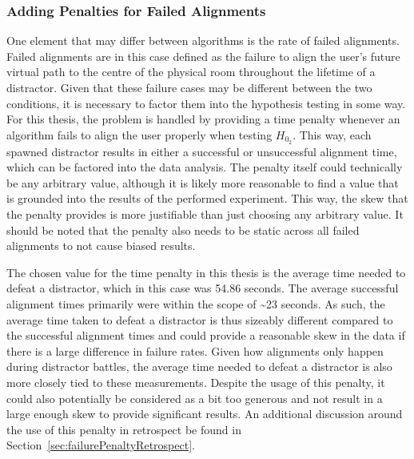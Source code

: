\subsubsection{Adding Penalties for Failed Alignments}
One element that may differ between algorithms is the rate of failed alignments. Failed alignments are in this case defined as the failure to align the user's future virtual path to the centre of the physical room throughout the lifetime of a distractor. Given that these failure cases may be different between the two conditions, it is necessary to factor them into the hypothesis testing in some way. For this thesis, the problem is handled by providing a time penalty whenever an algorithm fails to align the user properly when testing $H_{0_2}$. This way, each spawned distractor results in either a successful or unsuccessful alignment time, which can be factored into the data analysis. The penalty itself could technically be any arbitrary value, although it is likely more reasonable to find a value that is grounded into the results of the performed experiment. This way, the skew that the penalty provides is more justifiable than just choosing any arbitrary value. It should be noted that the penalty also needs to be static across all failed alignments to not cause biased results.

The chosen value for the time penalty in this thesis is the average time needed to defeat a distractor, which in this case was 54.86 seconds. The average successful alignment times primarily were within the scope of \textasciitilde23 seconds. As such, the average time taken to defeat a distractor is thus sizeably different compared to the successful alignment times and could provide a reasonable skew in the data if there is a large difference in failure rates. Given how alignments only happen during distractor battles, the average time needed to defeat a distractor is also more closely tied to these measurements. Despite the usage of this penalty, it could also potentially be considered as a bit too generous and not result in a large enough skew to provide significant results. An additional discussion around the use of this penalty in retrospect be found in Section~\ref{sec:failurePenaltyRetrospect}.

